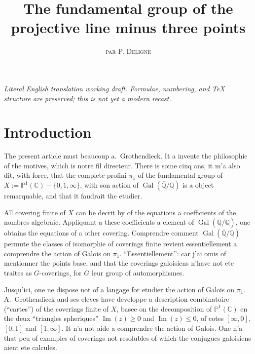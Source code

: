 \documentclass[12pt,a4paper]{article}
\title{The fundamental group of the projective line minus three points}
\author{\textsc{par P. Deligne}}
\date{}
\theoremstyle{plain}
\theoremstyle{definition}
\theoremstyle{remark}
\DeclareMathOperator{\Gal}{Gal}
\providecommand{\Gal}{\operatorname{Gal}}
\begin{document}
\begin{center}\small\emph{Literal English translation working draft. Formulae, numbering, and TeX structure are preserved; this is not yet a modern recast.}\end{center}
\vspace{0.5em}

\maketitle
\thispagestyle{empty}

\section*{Introduction}

The present article must beaucoup a.~Grothendieck. It a invente the
philosophie of the motives, which is notre fil directeur. There is some cinq
ans, it m'a also dit, with force, that the complete profini $\pi_1$ of the fundamental group of $X := \mathbb{P}^1(\mathbb{C}) - \{0, 1, \infty\}$, with son action of
$\Gal(\overline{\mathbb{Q}}/\mathbb{Q})$ is a object remarquable, and that it faudrait the etudier.

All covering finite of $X$ can be decrit by of the equations a coefficients
of the nombres algebraic. Appliquant a these coefficients a element of
$\Gal(\overline{\mathbb{Q}}/\mathbb{Q})$, one obtains the equations of a other covering. Comprendre
comment $\Gal(\overline{\mathbb{Q}}/\mathbb{Q})$ permute the classes of isomorphie of coverings finite
revient essentiellement a comprendre the action of Galois on $\pi_1$. ``Essentiellement'':
car j'ai omis of mentionner the points base, and that the coverings galoisiens n'have not
ete traites as $G$-coverings, for $G$ leur group of automorphismes.

Jusqu'ici, one ne dispose not of a langage for etudier the action of Galois on
$\pi_1$. A.~Grothendieck and ses eleves have developpe a description combinatoire
(``cartes'') of the coverings finite of $X$, basee on the decomposition of
$\mathbb{P}^1(\mathbb{C})$ en the deux ``triangles spheriques'' $\operatorname{Im}(z) \geq 0$ and
$\operatorname{Im}(z) \leq 0$, of cotes $[\infty, 0]$, $[0,1]$ and $[1,\infty]$.
It n'a not aide a comprendre the action of Galois. One n'a that peu of examples of
coverings not resolubles of which the conjugues galoisiens aient ete calcules.
\end{document}
